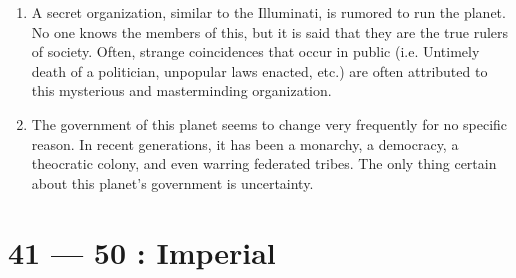 \documentclass{article}
\begin{document}
\begin{enumerate}
	\item A secret organization, similar to the Illuminati, is rumored to run the planet. No one knows the members of this, but it is said that they are the true rulers of society. Often, strange coincidences that occur in public (i.e. Untimely death of a politician, unpopular laws enacted, etc.) are often attributed to this mysterious and masterminding organization.
	\item The government of this planet seems to change very frequently for no specific reason. In recent generations, it has been a monarchy, a democracy, a theocratic colony, and even warring federated tribes. The only thing certain about this planet’s government is uncertainty.
\end{enumerate}
\section*{41 --- 50 : Imperial}
\end{document}
